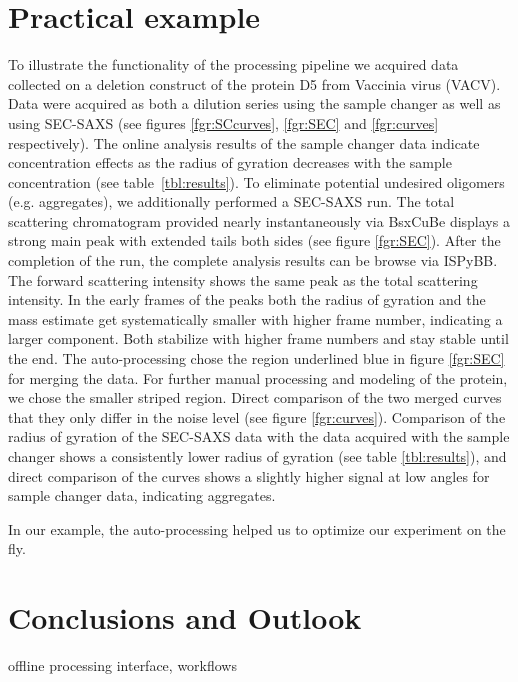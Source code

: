 \documentclass[preprint,pdf]{iucr}              %
\begin{document}
\section{Practical example}
To illustrate the functionality of the processing pipeline we acquired data collected
on a deletion construct of the protein D5 from  Vaccinia virus (VACV).
Data were acquired as both a dilution series using the sample changer as well as
using SEC-SAXS (see figures \ref{fgr:SCcurves}, \ref{fgr:SEC} and \ref{fgr:curves} respectively).
The online analysis results of the sample changer data indicate concentration effects
as the radius of gyration decreases with the  sample concentration (see table~\ref{tbl:results}).
To eliminate potential undesired oligomers (e.g. aggregates), we additionally performed a SEC-SAXS run.
The total scattering chromatogram provided nearly instantaneously via BsxCuBe displays a strong main
peak with extended tails both sides (see figure \ref{fgr:SEC}).
After the completion of the run, the complete analysis results can be browse via
ISPyBB.
The forward scattering intensity shows the same peak as the total scattering intensity.
In the early frames of the peaks both the radius of gyration and the mass estimate get systematically
smaller with higher frame number, indicating a larger component.
Both stabilize with higher frame numbers and stay stable until the end.
The auto-processing chose the region underlined blue in figure  \ref{fgr:SEC}
for merging the data.
For further manual processing and modeling of the protein, we chose the smaller
striped region.
Direct comparison of the two merged curves that they only differ in the noise level
(see figure \ref{fgr:curves}).
Comparison of the radius of gyration of the SEC-SAXS data with the data acquired with the sample
changer shows a consistently lower radius of gyration (see table \ref{tbl:results}), and direct
comparison of the curves shows a slightly higher signal at low angles for sample changer data,
indicating aggregates.

In our example, the auto-processing helped us to optimize our experiment on the fly.

\section{Conclusions and Outlook}
offline processing interface, workflows

\appendix
{}
\end{document}
